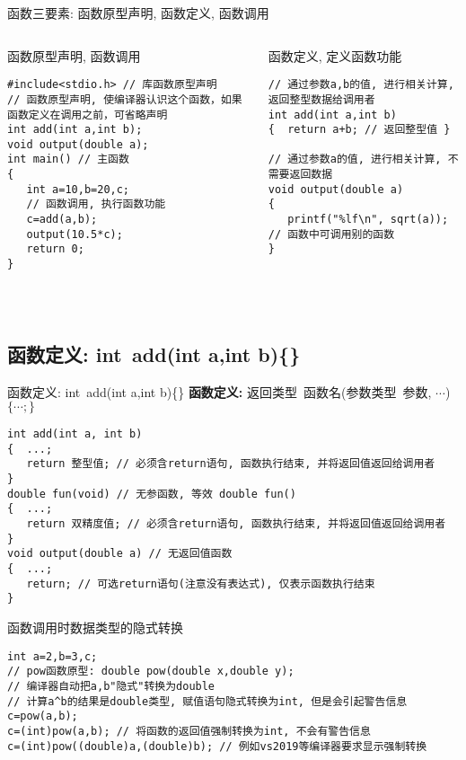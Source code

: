 \begin{frame}{函数三要素: 函数原型声明, 函数定义, 函数调用}
\vspace{-0.2cm}
\begin{columns}[T]
\begin{beamerboxesrounded}{函数原型声明, 函数调用}
\begin{lstlisting}
#include<stdio.h> // 库函数原型声明
// 函数原型声明, 使编译器认识这个函数，如果函数定义在调用之前，可省略声明
int add(int a,int b); 
void output(double a);
int main() // 主函数
{
   int a=10,b=20,c;
   // 函数调用, 执行函数功能
   c=add(a,b); 
   output(10.5*c);
   return 0; 
}
\end{lstlisting}
\end{beamerboxesrounded}
\begin{beamerboxesrounded}{函数定义, 定义函数功能}
\begin{lstlisting}
// 通过参数a,b的值, 进行相关计算, 返回整型数据给调用者
int add(int a,int b)
{  return a+b; // 返回整型值 }

// 通过参数a的值, 进行相关计算, 不需要返回数据
void output(double a)
{  
   printf("%lf\n", sqrt(a)); // 函数中可调用别的函数
}
\end{lstlisting}
\end{beamerboxesrounded}
\end{columns}
~\\
\end{frame}

\subsection{函数定义: int\, add(int a,int b)\{\quad\}}

\begin{frame}{函数定义: int\, add(int a,int b)\{\quad\}}
\textbf{函数定义: } 返回类型\, 函数名(参数类型\, 参数, $\cdots$) $\{\cdots ; \}$
\begin{lstlisting}
int add(int a, int b)
{  ...;
   return 整型值; // 必须含return语句, 函数执行结束, 并将返回值返回给调用者
}
double fun(void) // 无参函数, 等效 double fun() 
{  ...;
   return 双精度值; // 必须含return语句, 函数执行结束, 并将返回值返回给调用者
}
void output(double a) // 无返回值函数
{  ...;
   return; // 可选return语句(注意没有表达式), 仅表示函数执行结束
}
\end{lstlisting}
\end{frame}

\begin{frame}{函数调用时数据类型的隐式转换}
\begin{lstlisting}
int a=2,b=3,c;
// pow函数原型: double pow(double x,double y);
// 编译器自动把a,b"隐式"转换为double
// 计算a^b的结果是double类型, 赋值语句隐式转换为int, 但是会引起警告信息
c=pow(a,b);
c=(int)pow(a,b); // 将函数的返回值强制转换为int, 不会有警告信息
c=(int)pow((double)a,(double)b); // 例如vs2019等编译器要求显示强制转换
\end{lstlisting}
\end{frame}

